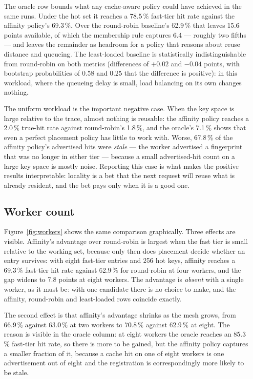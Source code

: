 \documentclass[10pt,twocolumn]{article}
\begin{document}
The oracle row bounds what any cache-aware policy could have achieved in the
same runs. Under the hot set it reaches a 78.5\,\% fast-tier hit rate against
the affinity policy's 69.3\,\%. Over the round-robin baseline's 62.9\,\%
that leaves 15.6 points available, of which the membership rule captures 6.4
--- roughly two fifths --- and leaves the remainder as headroom for a policy
that reasons about reuse distance and queueing. The
least-loaded baseline is statistically indistinguishable from round-robin on
both metrics (differences of $+0.02$ and $-0.04$ points, with bootstrap
probabilities of 0.58 and 0.25 that the difference is positive): in this
workload, where the queueing delay is small, load balancing on its own
changes nothing.

The uniform workload is the important negative case. When the key space is
large relative to the trace, almost nothing is reusable: the affinity policy
reaches a 2.0\,\% true-hit rate against round-robin's 1.8\,\%, and the
oracle's 7.1\,\% shows that even a perfect placement policy has little to
work with. Worse, 67.8\,\% of the affinity policy's advertised hits were
\emph{stale} --- the worker advertised a fingerprint that was no longer in
either tier --- because a small advertised-hit count on a large key space is
mostly noise. Reporting this case is what makes the positive results
interpretable: locality is a bet that the next request will reuse what is
already resident, and the bet pays only when it is a good one.

\subsection{Worker count}



Figure~\ref{fig:workers} shows the same comparison graphically. Three effects
are visible. Affinity's advantage over round-robin is largest when the fast
tier is small relative to the working set, because only then does placement
decide whether an entry survives: with eight fast-tier entries and 256 hot
keys, affinity reaches a 69.3\,\% fast-tier hit rate against 62.9\,\% for
round-robin at four workers, and the gap widens to 7.8 points at eight
workers. The advantage is \emph{absent} with a single worker, as it must be:
with one candidate there is no choice to make, and the affinity, round-robin
and least-loaded rows coincide exactly.

The second effect is that affinity's advantage shrinks as the mesh grows, from
66.9\,\% against 63.0\,\% at two workers to 70.8\,\% against 62.9\,\% at
eight. The reason is visible in the oracle column: at eight workers the
oracle reaches an 85.3\,\% fast-tier hit rate, so there is more to be gained,
but the affinity policy captures a smaller fraction of it, because a cache
hit on one of eight workers is one advertisement out of eight and the
registration is correspondingly more likely to be stale.
\end{document}
